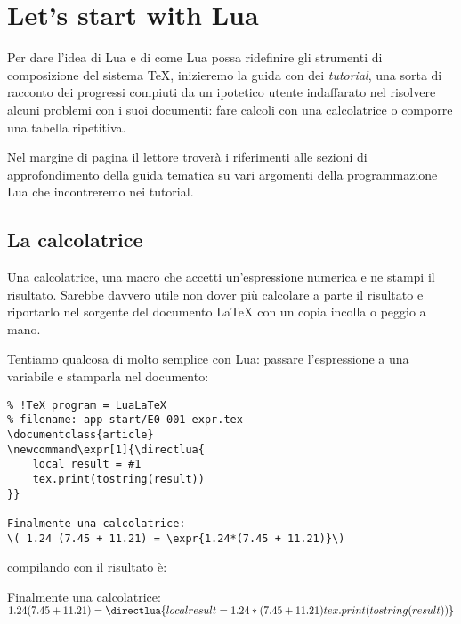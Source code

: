 


\chapter{Let's start with Lua}
\label{chGo}

Per dare l'idea di Lua e di come Lua possa ridefinire gli strumenti di
composizione del sistema \TeX, inizieremo la guida con dei \emph{tutorial}, una
sorta di racconto dei progressi compiuti da un ipotetico utente \LuaTeX{}
indaffarato nel risolvere alcuni problemi con i suoi documenti: fare calcoli con
una calcolatrice o comporre una tabella ripetitiva.

Nel margine di pagina il lettore troverà i riferimenti alle sezioni di
approfondimento della guida tematica su vari argomenti della programmazione Lua
che incontreremo nei tutorial.


\section{La calcolatrice}

Una calcolatrice, una macro  che accetti un'espressione numerica e
ne stampi il risultato. Sarebbe davvero utile non dover più calcolare a
parte il risultato e riportarlo nel sorgente del documento \LaTeX{} con un copia
incolla o peggio a mano.

Tentiamo qualcosa di molto semplice con Lua: passare l'espressione a una
variabile e stamparla nel documento:
\begin{Verbatim}
% !TeX program = LuaLaTeX
% filename: app-start/E0-001-expr.tex
\documentclass{article}
\newcommand\expr[1]{\directlua{
    local result = #1
    tex.print(tostring(result))
}}

Finalmente una calcolatrice:
\( 1.24 (7.45 + 11.21) = \expr{1.24*(7.45 + 11.21)}\)

\end{Verbatim}

\newcommand\expr[1]{\directlua{
    local result = #1
    tex.print(tostring(result))
}}
compilando con \LuaLaTeX{} il risultato è:
\begin{tcolorbox}
Finalmente una calcolatrice: \( 1.24 (7.45 + 11.21) = \expr{1.24*(7.45 + 11.21)}\)
\end{tcolorbox}


